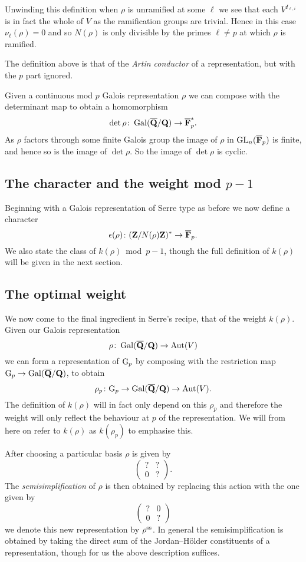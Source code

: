 \documentclass[a4paper,12pt]{article}
\begin{document}
\begin{rmk}\label{rmk-unram}
Unwinding this definition when $\rho$ is unramified at some $\ell$ we see that each $V^{I_{\ell,i}}$ is in fact the whole of $V$ as the ramification groups are trivial. %
Hence in this case $\nu_\ell(\rho) = 0$ and so $N(\rho)$ is only divisible by the primes $\ell \ne p$ at which $\rho$ is ramified.
\end{rmk}

The definition above is that of the \emph{Artin conductor} of a representation, but with the $p$ part ignored. %

Given a continuous mod $p$ Galois representation $\rho$ we can compose with the determinant map to obtain a homomorphism
\[
\det \rho\colon \operatorname{Gal}(\overline{\mathbf{Q}}/\mathbf{Q}) \to \overline{\mathbf{F}}_p^*.
\]
As $\rho$ factors through some finite Galois group the image of $\rho$ in $\operatorname{GL}_n(\overline{\mathbf{F}}_p)$ is finite, and hence so is the image of $\det \rho$.
So the image of $\det \rho$ is cyclic.


\subsection{The character and the weight mod $p-1$}
Beginning with a Galois representation of Serre type as before we now define a character
\[
\epsilon(\rho)\colon  (\mathbf{Z}/N(\rho)\mathbf{Z})^* \to \overline{\mathbf{F}}_p.
\]
We also state the class of $k(\rho)$~mod~$p-1$, though the full definition of $k(\rho)$ will be given in the next section.


\subsection{The optimal weight}
We now come to the final ingredient in Serre's recipe, that of the weight $k(\rho)$.
Given our Galois representation
\[
\rho \colon \operatorname{Gal}(\overline{\mathbf{Q}}/\mathbf{Q}) \to \operatorname{Aut}(V)
\]
we can form a representation of $\mathrm{G}_p$ by composing with the restriction map $\mathrm{G}_p \to\operatorname{Gal}(\overline{\mathbf{Q}}/\mathbf{Q})$, to obtain
\[
\rho_p\colon \mathrm{G}_p \to \operatorname{Gal}(\overline{\mathbf{Q}}/\mathbf{Q}) \to \operatorname{Aut}(V).
\]
The definition of $k(\rho)$ will in fact only depend on this $\rho_p$ and therefore the weight will only reflect the behaviour at $p$ of the representation.
We will from here on refer to $k(\rho)$ as $k(\rho_p)$ to emphasise this.

After choosing a particular basis $\rho$ is given by
\[
\begin{pmatrix}
? & ? \\
0 & ?
\end{pmatrix}.
\]
The \emph{semisimplification} of $\rho$ is then obtained by replacing this action with the one given by
\[
\begin{pmatrix}
? & 0 \\
0 & ?
\end{pmatrix}
\]
we denote this new representation by $\rho^\text{ss}$. %
In general the semisimplification is obtained by taking the direct sum of the Jordan--H\"older constituents of a representation, though for us the above description suffices.
\end{document}
